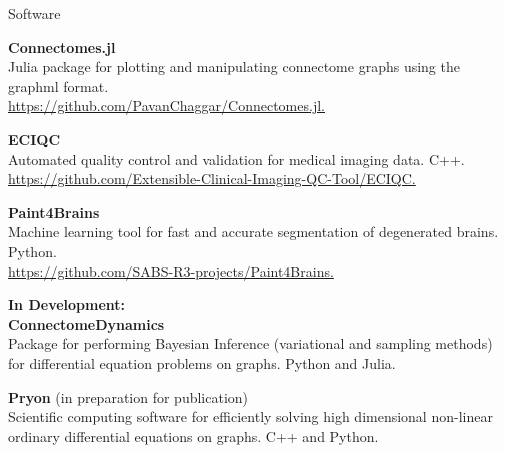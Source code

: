 \begin{rSection}{Software}

{\bf Connectomes.jl} \\
Julia package for plotting and manipulating connectome graphs using the graphml format. \\
\href{https://github.com/PavanChaggar/Connectomes.jl}{https://github.com/PavanChaggar/Connectomes.jl.}

{\bf ECIQC} \\
Automated quality control and validation for medical imaging data. C++.  \\
\href{https://github.com/Extensible-Clinical-Imaging-QC-Tool/ECIQC}{https://github.com/Extensible-Clinical-Imaging-QC-Tool/ECIQC.}

{\bf Paint4Brains} \\
Machine learning tool for fast and accurate segmentation of degenerated brains. Python. \\
\href{https://github.com/SABS-R3-projects/Paint4Brains}{https://github.com/SABS-R3-projects/Paint4Brains.}

{\bf In Development: } \\
{\bf ConnectomeDynamics}  \\
Package for performing Bayesian Inference (variational and sampling methods) for differential equation problems on graphs. Python and Julia. 

{\bf Pryon} (in preparation for publication) \\
Scientific computing software for efficiently solving high dimensional non-linear ordinary differential equations on graphs. C++ and Python.

\end{rSection}
